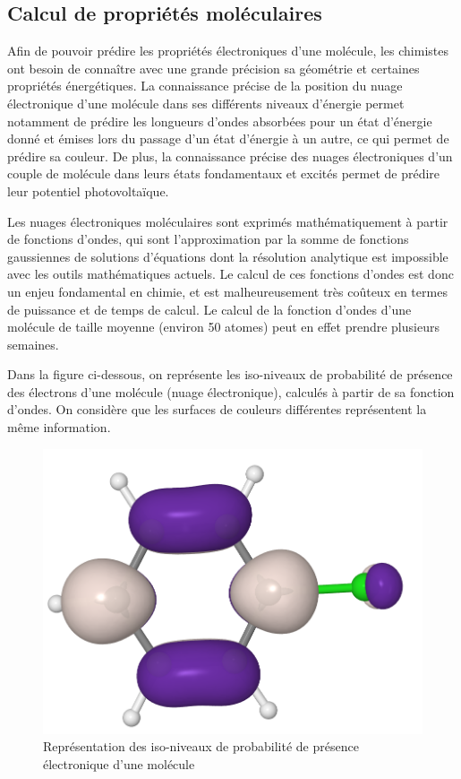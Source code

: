 \subsection{Calcul de propriétés moléculaires}

\par Afin de pouvoir prédire les propriétés électroniques d'une molécule, les chimistes ont besoin de connaître avec une grande précision sa géométrie et certaines propriétés énergétiques. La connaissance précise de la position du nuage électronique d'une molécule dans ses différents niveaux d'énergie permet notamment de prédire les longueurs d'ondes absorbées pour un état d'énergie donné et émises lors du passage d'un état d'énergie à un autre, ce qui permet de prédire sa couleur.
De plus, la connaissance précise des nuages électroniques d'un couple de molécule dans leurs états fondamentaux et excités permet de prédire leur potentiel photovoltaïque. \\

\par Les nuages électroniques moléculaires sont exprimés mathématiquement à partir de fonctions d'ondes, qui sont l'approximation par la somme de fonctions gaussiennes de solutions d'équations dont la résolution analytique est impossible avec les outils mathématiques actuels. Le calcul de ces fonctions d'ondes est donc un enjeu fondamental en chimie, et est malheureusement très coûteux en termes de puissance et de temps de calcul. Le calcul de la fonction d'ondes d'une molécule de taille moyenne (environ 50 atomes) peut en effet prendre plusieurs semaines. \\

\par Dans la figure ci-dessous, on représente les iso-niveaux de probabilité de présence des électrons d'une molécule (nuage électronique), calculés à partir de sa fonction d'ondes. On considère que les surfaces de couleurs différentes représentent la même information.\\ 

\begin{figure}[!h]
	\centering
	\includegraphics[scale=0.25]{images/iso_niveaux.png}
	\caption{Représentation des iso-niveaux de probabilité de présence électronique d'une molécule}
\end{figure}


